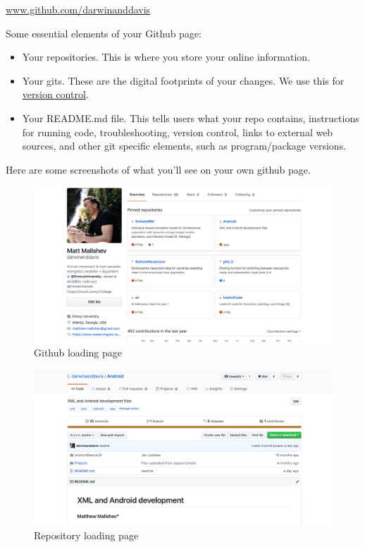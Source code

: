 \documentclass[10,portrait]{article}
\providecommand{\tightlist}{%
  \setlength{\itemsep}{0pt}\setlength{\parskip}{0pt}}
\begin{document}
\url{www.github.com/darwinanddavis}

Some essential elements of your Github page:

\begin{itemize}
\tightlist
\item
  Your repositories. This is where you store your online information.\\
  \hspace*{0.333em}
\item
  Your gits. These are the digital footprints of your changes. We use
  this for
  \href{https://git-scm.com/book/en/v2/Getting-Started-About-Version-Control}{version
  control}.\\
  \hspace*{0.333em}
\item
  Your README.md file. This tells users what your repo contains,
  instructions for running code, troubleshooting, version control, links
  to external web sources, and other git specific elements, such as
  program/package versions.\\
  \hspace*{0.333em}
\end{itemize}

Here are some screenshots of what you'll see on your own github page.

\begin{figure}
\centering
\includegraphics{loadingpage.png}
\caption{Github loading page}
\end{figure}

\begin{figure}
\centering
\includegraphics{repopage.png}
\caption{Repository loading page}
\end{figure}
\end{document}

